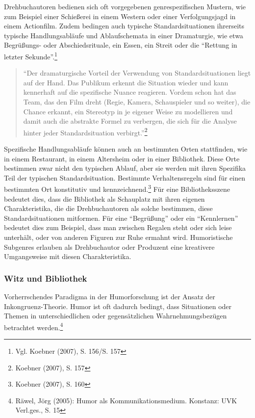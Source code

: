 Drehbuchautoren bedienen sich oft vorgegebenen genrespezifischen
Mustern, wie zum Beispiel einer Schießerei in einem Western oder einer
Verfolgungsjagd in einem Actionfilm. Zudem bedingen auch typische
Standardsituationen ihrerseits typische Handlungsabläufe und
Ablaufschemata in einer Dramaturgie, wie etwa Begrüßungs- oder
Abschiedsrituale, ein Essen, ein Streit oder die \enquote{Rettung in
letzter Sekunde}.\footnote{Vgl. Koebner (2007), S. 156/S. 157}

\begin{quote}
\enquote{Der dramaturgische Vorteil der Verwendung von
Standardsituationen liegt auf der Hand. Das Publikum erkennt die
Situation wieder und kann kennerhaft auf die spezifische Nuance
reagieren. Vordem schon hat das Team, das den Film dreht (Regie, Kamera,
Schauspieler und so weiter), die Chance erkannt, ein Stereotyp in je
eigener Weise zu modellieren und damit auch die abstrakte Formel zu
verbergen, die sich für die Analyse hinter jeder Standardsituation
verbirgt.}\footnote{Koebner (2007), S. 157}
\end{quote}

Spezifische Handlungsabläufe können auch an bestimmten Orten
stattfinden, wie in einem Restaurant, in einem Altersheim oder in einer
Bibliothek. Diese Orte bestimmen zwar nicht den typischen Ablauf, aber
sie werden mit ihren Spezifika Teil der typischen Standardsituation.
Bestimmte Verhaltensregeln sind für einen bestimmten Ort konstitutiv und
kennzeichnend.\footnote{Koebner (2007), S. 160} Für eine
Bibliotheksszene bedeutet dies, dass die Bibliothek als Schauplatz mit
ihren eigenen Charakteristika, die die Drehbuchautoren als solche
bestimmen, diese Standardsituationen mitformen. Für eine
\enquote{Begrüßung} oder ein \enquote{Kennlernen} bedeutet dies zum
Beispiel, dass man zwischen Regalen steht oder sich leise unterhält,
oder von anderen Figuren zur Ruhe ermahnt wird. Humoristische Subgenres
erlauben als Drehbuchautor oder Produzent eine kreativere Umgangsweise
mit diesen Charakteristika.

\subsubsection{Witz und Bibliothek}\label{witz-und-bibliothek}

Vorherrschendes Paradigma in der Humorforschung ist der Ansatz der
Inkongruenz-Theorie. Humor ist oft dadurch bedingt, dass Situationen
oder Themen in unterschiedlichen oder gegensätzlichen
Wahrnehmungsbezügen betrachtet werden.\footnote{Räwel, Jörg (2005):
  Humor als Kommunikationsmedium. Konstanz: UVK Verl.ges., S. 15}

